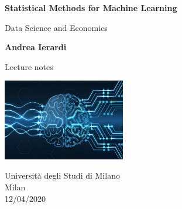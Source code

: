 \documentclass[12pt]{article}
\begin{document}
\begin{titlepage}
    \begin{center}
        \vspace*{1cm}
            
        \Huge
        \textbf{Statistical Methods for Machine Learning}
            
        \vspace{0.5cm}
        \LARGE
        Data Science and Economics
            
        \vspace{1.5cm}
            
        \textbf{Andrea Ierardi}
            
        \vfill
            
        Lecture notes
            
        \vspace{0.8cm}
            
        \includegraphics[width=0.4\textwidth]{frontpage}
            
        \Large
        Università degli Studi di Milano
        \\
        Milan\\
        12/04/2020
            
    \end{center}
\end{titlepage}


\newpage

\tableofcontents
\newpage




\newpage


\newpage


\newpage



\newpage



\newpage



\newpage



\newpage



\newpage



\newpage


\newpage


\end{document}
